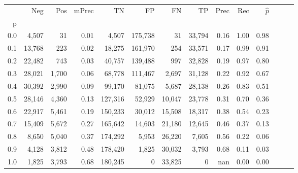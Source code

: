 \begin{tabular}{rrrrrrrrrrrrrr}
\toprule
{} &     Neg &    Pos & mPrec &       TN &       FP &      FN &      TP &  Prec &   Rec & $\hat{p}$ \\
p   &         &        &       &          &          &         &         &       &       &           \\
\midrule
0.0 &   4,507 &     31 &  0.01 &    4,507 &  175,738 &      31 &  33,794 &  0.16 &  1.00 &      0.98 \\
0.1 &  13,768 &    223 &  0.02 &   18,275 &  161,970 &     254 &  33,571 &  0.17 &  0.99 &      0.91 \\
0.2 &  22,482 &    743 &  0.03 &   40,757 &  139,488 &     997 &  32,828 &  0.19 &  0.97 &      0.80 \\
0.3 &  28,021 &  1,700 &  0.06 &   68,778 &  111,467 &   2,697 &  31,128 &  0.22 &  0.92 &      0.67 \\
0.4 &  30,392 &  2,990 &  0.09 &   99,170 &   81,075 &   5,687 &  28,138 &  0.26 &  0.83 &      0.51 \\
0.5 &  28,146 &  4,360 &  0.13 &  127,316 &   52,929 &  10,047 &  23,778 &  0.31 &  0.70 &      0.36 \\
0.6 &  22,917 &  5,461 &  0.19 &  150,233 &   30,012 &  15,508 &  18,317 &  0.38 &  0.54 &      0.23 \\
0.7 &  15,409 &  5,672 &  0.27 &  165,642 &   14,603 &  21,180 &  12,645 &  0.46 &  0.37 &      0.13 \\
0.8 &   8,650 &  5,040 &  0.37 &  174,292 &    5,953 &  26,220 &   7,605 &  0.56 &  0.22 &      0.06 \\
0.9 &   4,128 &  3,812 &  0.48 &  178,420 &    1,825 &  30,032 &   3,793 &  0.68 &  0.11 &      0.03 \\
1.0 &   1,825 &  3,793 &  0.68 &  180,245 &        0 &  33,825 &       0 &   nan &  0.00 &      0.00 \\
\bottomrule
\end{tabular}
